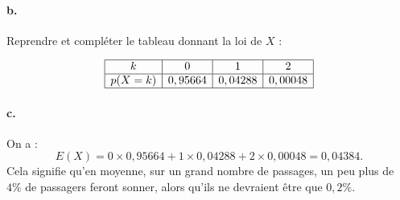 \documentclass[10pt]{article}
\begin{document}
	\paragraph{b.} Reprendre et compléter le tableau donnant la loi de \(X\) :
	
	\[
	\begin{array}{|c|c|c|c|}
		\hline
		k            & 0        & 1        & 2        \\
		\hline
		p(X = k)     & 0,95664 & 0,04288 & 0,00048 \\
		\hline
	\end{array}
	\]
	
	\paragraph{c.} On a :
	\[
	E(X) = 0 \times 0,95664 + 1 \times 0,04288 + 2 \times 0,00048 = 0,04384.
	\]
	Cela signifie qu'en moyenne, sur un grand nombre de passages, un peu plus de \(4\%\) de passagers feront sonner, alors qu'ils ne devraient être que \(0,2\%\).
\end{document}

